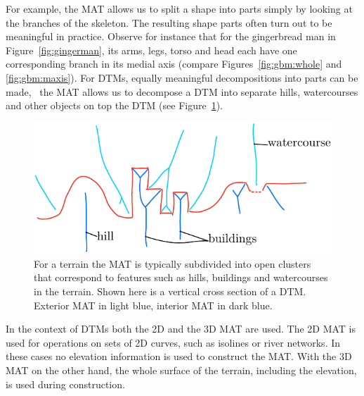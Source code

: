 For example, the MAT allows us to split a shape into parts simply by looking at the branches of the skeleton. 
The resulting shape parts often turn out to be meaningful in practice. 
Observe for instance that for the gingerbread man in Figure~\ref{fig:gingerman}, its arms, legs, torso and head each have one corresponding branch in its medial axis (compare Figures~\ref{fig:gbm:whole} and \ref{fig:gbm:maxis}).
For DTMs, equally meaningful decompositions into parts can be made, \eg\ the MAT allows us to decompose a DTM into separate hills, watercourses and other objects on top the DTM (see Figure~\ref{fig:matterrain}).
\begin{figure}[tbp]
	\centering
	\includegraphics[width=0.8\linewidth]{figs/MAT_hierarchy.pdf}
	\caption{For a terrain the MAT is typically subdivided into open clusters that correspond to features such as hills, buildings and watercourses in the terrain. Shown here is a vertical cross section of a DTM. Exterior MAT in light blue, interior MAT in dark blue.}
	\label{fig:matterrain}
\end{figure}

In the context of DTMs both the 2D and the 3D MAT are used. 
The 2D MAT is used for operations on sets of 2D curves, such as isolines or river networks. 
In these cases no elevation information is used to construct the MAT.
With the 3D MAT on the other hand, the whole surface of the terrain, including the elevation, is used during construction.



